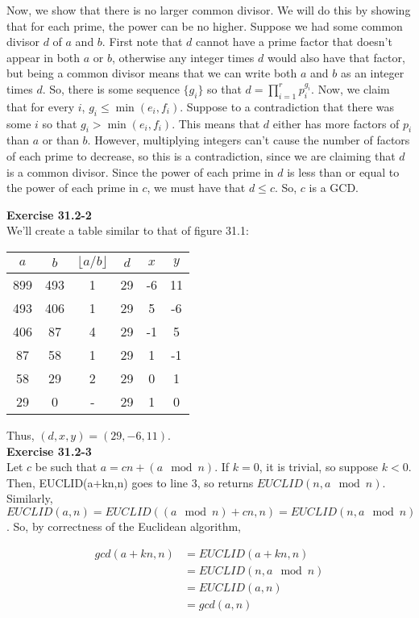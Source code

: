 \documentclass{article}
\begin{document}
Now, we show that there is no larger common divisor. We will do this by showing that for each prime, the power can be no higher. Suppose we had some common divisor $d$ of $a$ and $b$. First note that $d$ cannot have a prime factor that doesn't appear in both $a$ or $b$, otherwise any integer times $d$ would also have that factor, but being a common divisor means that we can write both $a$ and $b$ as an integer times $d$. So, there is some sequence $\{g_i\}$ so that $d = \prod_{i=1}^r p_i^{g_i}$. Now, we claim that for every $i$, $g_i \le \min(e_i,f_i)$. Suppose to a contradiction that there was some $i$ so that $g_i>\min(e_i,f_i)$. This means that $d$ either has more factors of $p_i$ than $a$ or than $b$. However, multiplying integers can't cause the number of factors of each prime to decrease, so this is a contradiction, since we are claiming that $d$ is a common divisor. Since the power of each prime in $d$ is less than or equal to the power of each prime in $c$, we must have that $d\le c$. So, $c$ is a GCD.

\noindent\textbf{Exercise 31.2-2}\\

We'll create a table similar to that of figure 31.1:

\begin{tabular}{cccccc} 
$a$ & $b$ & $\lfloor a/b \rfloor$ & $d$ & $x$ & $y$ \\ \hline
899 & 493 & 1 & 29 & -6 & 11 \\
493 & 406 & 1 & 29 & 5 & -6 \\
406 & 87 & 4 & 29 & -1 & 5 \\
87 & 58 & 1 & 29 & 1 & -1 \\
58 & 29 & 2 & 29 & 0 & 1\\
29 & 0 & - & 29 & 1 & 0
\end{tabular}

Thus, $(d,x,y) = (29,-6,11)$. \\

\noindent\textbf{Exercise 31.2-3}\\

Let $c$ be such that $a = cn +(a\mod n)$. If $k=0$, it is trivial, so suppose $k<0$. Then, EUCLID(a+kn,n) goes to line 3, so returns $EUCLID(n, a\mod n)$. Similarly, $EUCLID(a,n) = EUCLID((a\mod n) + cn, n) = EUCLID(n,a\mod n)$. So, by correctness of the Euclidean algorithm,

\begin{align*}
gcd(a+kn,n) &= EUCLID(a+kn,n)\\
& =  EUCLID(n,a\mod n)\\
& = EUCLID(a,n)\\
& = gcd(a,n)
\end{align*}
\end{document}
